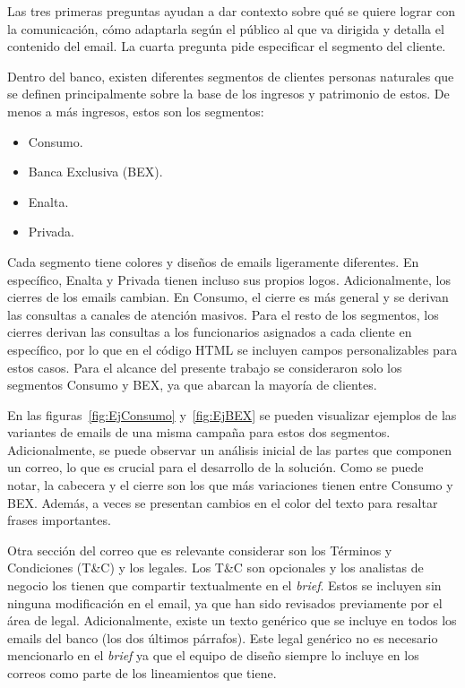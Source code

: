 Las tres primeras preguntas ayudan a dar contexto sobre qué se quiere lograr con la comunicación, cómo adaptarla según el público al que va dirigida y detalla el contenido del email. La cuarta pregunta pide especificar el segmento del cliente.

Dentro del banco, existen diferentes segmentos de clientes personas naturales que se definen principalmente sobre la base de los ingresos y patrimonio de estos. De menos a más ingresos, estos son los segmentos: 
\begin{itemize}
    \item Consumo.
    \item Banca Exclusiva (BEX).
    \item Enalta.
    \item Privada.
\end{itemize}

Cada segmento tiene colores y diseños de emails ligeramente diferentes. En específico, Enalta y Privada tienen incluso sus propios logos. Adicionalmente, los cierres de los emails cambian. En Consumo, el cierre es más general y se derivan las consultas a canales de atención masivos. Para el resto de los segmentos, los cierres derivan las consultas a los funcionarios asignados a cada cliente en específico, por lo que en el código HTML se incluyen campos personalizables para estos casos. Para el alcance del presente trabajo se consideraron solo los segmentos Consumo y BEX, ya que abarcan la mayoría de clientes. 

En las figuras~\ref{fig:EjConsumo} y~\ref{fig:EjBEX} se pueden visualizar ejemplos de las variantes de emails de una misma campaña para estos dos segmentos. Adicionalmente, se puede observar un análisis inicial de las partes que componen un correo, lo que es crucial para el desarrollo de la solución. Como se puede notar, la cabecera y el cierre son los que más variaciones tienen entre Consumo y BEX. Además, a veces se presentan cambios en el color del texto para resaltar frases importantes.

Otra sección del correo que es relevante considerar son los Términos y Condiciones (T\&C) y los legales. Los T\&C son opcionales y los analistas de negocio los tienen que compartir textualmente en el \textit{brief}. Estos se incluyen sin ninguna modificación en el email, ya que han sido revisados previamente por el área de legal. Adicionalmente, existe un texto genérico que se incluye en todos los emails del banco (los dos últimos párrafos). Este legal genérico no es necesario mencionarlo en el \textit{brief} ya que el equipo de diseño siempre lo incluye en los correos como parte de los lineamientos que tiene. 

